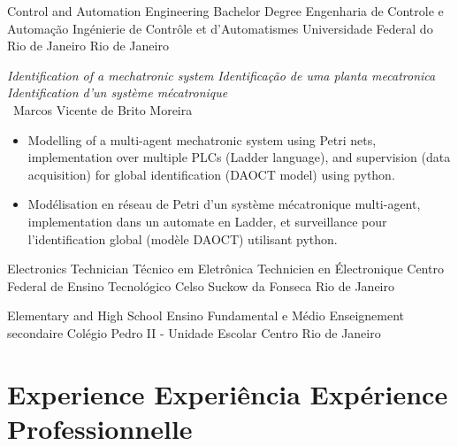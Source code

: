 \cventry{\apr\ 2013\newline \aug\ 2019\newline}
{
  \ml%
  {Control and Automation Engineering Bachelor Degree}
  {Engenharia de Controle e Automação}
  {Ingénierie de Contrôle et d'Automatismes}}
{\newline Universidade Federal do Rio de Janeiro}
{Rio de Janeiro}{\brazil}
{
  \ml
  {\emph{Identification of a mechatronic system}}
  {\emph{Identificação de uma planta mecatronica}}
  {\emph{Identification d'un système mécatronique}}%
  \\
  \supervisor\ Marcos Vicente de Brito Moreira
  \ml
  {
    \begin{itemize}
      \item Modelling of a multi-agent mechatronic system using Petri nets, implementation over multiple PLCs (Ladder language), and supervision (data acquisition) for global identification (DAOCT model) using python.
    \end{itemize}
  }
  {}
  {
    \begin{itemize}
    \item Modélisation en réseau de Petri d'un système mécatronique multi-agent, implementation dans un automate en Ladder, et surveillance pour l'identification global (modèle DAOCT) utilisant python.
  \end{itemize}
  }
}

\cventry{\apr\ 2010\newline \dec\ 2012\newline}
{
  \ml%
  {Electronics Technician}
  {Técnico em Eletrônica}
  {Technicien en Électronique}}
{\newline Centro Federal de Ensino Tecnológico Celso Suckow da Fonseca}
{\newline Rio de Janeiro}{\brazil}{}

\cventry{\apr\ 2006\newline \dec\ 2012\newline}
{
  \ml
  {Elementary and High School}
  {Ensino Fundamental e Médio}
  {Enseignement secondaire}%
}
{\newline Colégio Pedro II - Unidade Escolar Centro}
{Rio de Janeiro}{\brazil}{}

\section{
  \ml%
  {Experience}
  {Experiência}
  {Expérience Professionnelle}
}


